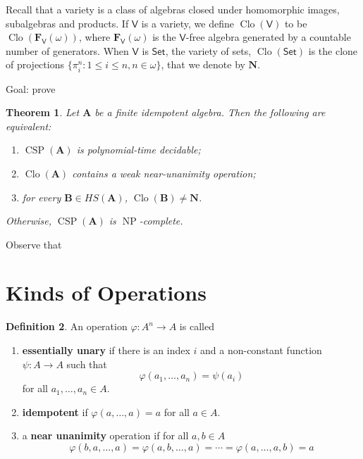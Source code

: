 \documentclass{amsart}
\theoremstyle{plain}
\newtheorem{theorem}{Theorem}[section]
\theoremstyle{definition}
\newtheorem{definition}[theorem]{Definition}
\theoremstyle{remark}
\def\phi{\varphi}
\DeclareMathOperator{\Clo}{Clo}
\DeclareMathOperator{\CSP}{CSP}
\DeclareMathOperator{\NP}{NP}
\begin{document}
Recall that a variety is a class of algebras closed under homomorphic images, subalgebras and products. 
If $\mathsf{V}$ is a variety, we define $\Clo(\mathsf{V})$ to be $\Clo(\mathbf{F}_\mathsf{V}(\omega))$, where $\mathbf{F}_\mathsf{V}(\omega)$ is the $\mathsf{V}$-free algebra generated by a countable number of generators.
When $\mathsf{V}$ is $\mathsf{Set}$, the variety of sets, $\Clo(\mathsf{Set})$ is the clone of projections $\{\pi^n_i: 1 \le i \le n, n \in \omega\}$, that we denote by $\mathbf{N}$. 

Goal: prove 

\begin{theorem}
    Let $\mathbf{A}$ be a finite 
    idempotent 
    algebra. 
    Then the following are equivalent: 
    \begin{enumerate}
        \item $\CSP(\mathbf{A})$ is polynomial-time decidable; 
        \item $\Clo(\mathbf{A})$ contains a weak near-unanimity operation; 
        \item for every $\mathbf{B} \in HS(\mathbf{A})$, $\Clo(\mathbf{B}) \neq \mathbf{N}$. 
    \end{enumerate}
    Otherwise, $\CSP(\mathbf{A})$ is $\NP$-complete. 
\end{theorem}

Observe that 

\section{Kinds of Operations}

\begin{definition}
    An operation $\phi: A^n \to A$ is called 
    \begin{enumerate}
        \item \textbf{essentially unary} if there is an index $i$ and a non-constant function $\psi: A \to A$ such that 
        \begin{equation*}
        \phi(a_1, \ldots, a_n) = \psi(a_i)
        \end{equation*}
        for all $a_1, \ldots, a_n \in A$. 
        \item \textbf{idempotent} if $\phi(a, \ldots, a)=a$ for all $a \in A$. 
        \item a \textbf{near unanimity} operation if for all $a,b \in A$ 
        \begin{equation*}
            \phi(b, a, \ldots, a) = \phi(a, b, \ldots, a) = \cdots = \phi(a, \ldots, a, b)= a 
        \end{equation*}
    \end{enumerate}
\end{definition}
\end{document}
